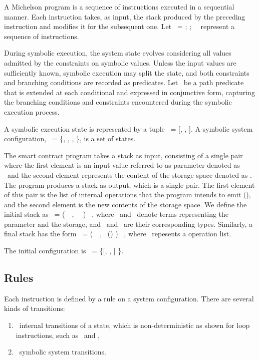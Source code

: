 \documentclass[a4paper,USenglish,cleveref, autoref, thm-restate]{lipics-v2021}
\begin{document}
A Michelson program is a sequence of instructions executed in a
sequential manner. Each instruction takes, as input, the stack
produced by the preceding instruction and modifies it for the
subsequent one. Let \INSTRUCTION\ = \InstructionOne; \InstructionTwo;
\DOT\  \InstructionN\ represent a sequence of instructions.

During symbolic execution,  the system state evolves considering all
values admitted by the constraints on symbolic values. Unless the
input values are sufficiently known, symbolic execution may split the
state, and both constraints and branching conditions are recorded as
predicates. Let \PREDICATE\ be a path predicate that is extended at
each conditional and expressed in conjunctive form, capturing the
branching conditions and constraints encountered during the symbolic
execution process. 
\begin{definition}
A symbolic execution state is represented by a tuple \STATE\ =
[\INSTRUCTION, \STACK, \PREDICATE].
A symbolic system configuration, \SYSTEM\ = \{\STATEONE, \STATETWO,
\DOT, \STATEN \}, is a set of  states.
\end{definition}

The smart contract program takes a stack as input, consisting of a
single pair where the first element is an input value referred to as
parameter denoted as \VPAR\ and the second element represents the
content of the storage space denoted as \VSTORAGE. The program
produces a stack as output, which is a single pair. The first element
of this pair is the list of internal operations that the program
intends to emit (\VOPERATIONLIST), and the second element is the new
contents of the storage space.  We define the initial stack as
\SINIT\   = (\KPAIR\ \VPAR\ \VSTORAGE, \TPAIR\ \TYF\ \TYS)
\STACKCONCAT\ \EMPTYSTACK, where \VPAR\ and \VSTORAGE\ denote terms
representing the parameter and the storage, and \TYF\ and \TYS\ are
their corresponding types. Similarly, a final stack has the form
\SFINAL\   = (\PAIR\ \VOPERATIONLIST\ \VSTORAGE, \TPAIR\
(\TOPERATIONLIST) \TYS) \STACKCONCAT\ \EMPTYSTACK, where
\VOPERATIONLIST\ repesents a operation list.

The initial configuration is \SYSTEMINIT\ = \{[\INSTRUCTION, \SINIT, \TRUE] \}. 

\subsection{Rules}
Each instruction is defined by a rule on a system configuration. There
are several kinds of transitions:
\begin{enumerate}
\item \StateTrans\ internal transitions of a state, which is
  non-deterministic  as shown for loop instructions, such as \LOOP\
  and \LOOPLEFT, 
\item \SystemTrans\ symbolic system transitions.
\end{enumerate}
\end{document}
